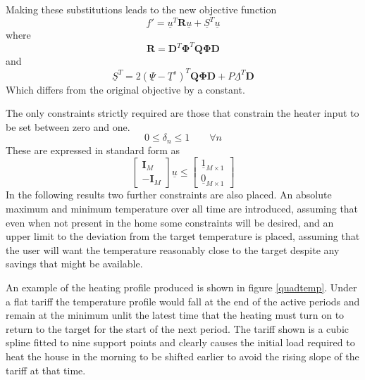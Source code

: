 \documentclass[a4paper, 10 pt, conference]{ieeeconf}  %
\begin{document}
Making these substitutions leads to the new objective function
\begin{equation}
\label{furuus}
f'=\underline{u}^{T}\mathbf{R}\underline{u}+\underline{S}^{T}\underline{u}
\end{equation}
where
\begin{equation}
\mathbf{R}=\mathbf{D}^{T}\boldsymbol{\Phi}^{T}\mathbf{Q}\boldsymbol{\Phi}\mathbf{D}
\end{equation}
and
\begin{equation}
\underline{S}^{T}=2(\underline{\Psi}-\underline{T}^s)^{T}\mathbf{Q}\boldsymbol{\Phi}\mathbf{D}+P\underline{\Lambda}^{T} \mathbf{D}
\end{equation}
Which differs from the original objective by a constant.

The only constraints strictly required are those that constrain the heater input to be set between zero and one. 
\begin{equation}
0 \leq \delta_{n} \leq 1 \qquad \forall n
\end{equation}
These are expressed in standard form as
\begin{equation}
\left[
\begin{array}{c}
\mathbf{I}_{M} \\ \hline
- \mathbf{I}_{M} 
\end{array}\right]\underline{u} \leq \left[\begin{array}{c}
\underline{1}_{M \times 1} \\ \hline
\underline{0}_{M \times 1}
\end{array}\right]
\end{equation}
In the following results two further constraints are also placed. An absolute maximum and minimum temperature over all time are introduced, assuming that even when not present in the home some constraints will be desired, and an upper limit to the deviation from the target temperature is placed, assuming that the user will want the temperature reasonably close to the target despite any savings that might be available.

An example of the heating profile produced is shown in figure \ref{quadtemp}. Under a flat tariff the temperature profile would fall at the end of the active periods and remain at the minimum unlit the latest time that the heating must turn on to return to the target for the start of the next period. The tariff shown is a cubic spline fitted to nine support points and clearly causes the initial load required to heat the house in the morning to be shifted earlier to avoid the rising slope of the tariff at that time.
\end{document}
